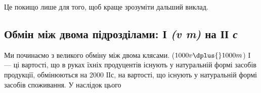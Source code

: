 Це покищо лише для того, щоб краще зрозуміти дальший виклад.
\label{original-305-1}

\subsection[Обмін між двома підрозділами]{Обмін
між двома підрозділами: І \emph{(v \dplus{} m)} на ІІ \emph{с}\footnotemark{}}

\label{original-305-2}

\noindent{}Ми починаємо з великого обміну між двома клясами. ($1000v \dplus{}
1000m$) І — ці вартості, що в руках їхніх продуцентів існують у натуральній
формі засобів продукції, обмінюються на 2000 ІІс, на вартості,
що існують у натуральній формі засобів споживання. У наслідок цього
\parbreak{}  %
